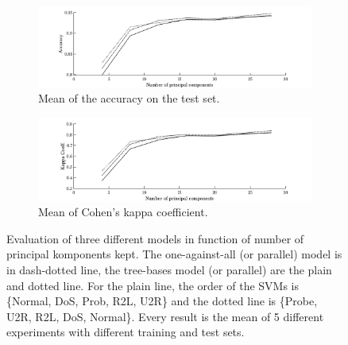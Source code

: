 \begin{figure}[ht!]
        \begin{subfigure}[b]{1\textwidth}  
            \centering 
            \includegraphics[width=.98\textwidth]{parts/chap-4/img-svm/pca-acc.png}
            \caption{Mean of the accuracy on the test set.} 
        \end{subfigure}
        \vfill
        \begin{subfigure}[b]{1\textwidth}   
            \centering 
            \includegraphics[width=.98\textwidth]{parts/chap-4/img-svm/pca-kappa.png}
            \caption{Mean of Cohen's kappa coefficient.} 
        \end{subfigure}
        \caption{Evaluation of three different models in function of number of principal komponents kept. The one-against-all (or parallel) model is in dash-dotted line, the tree-bases model (or parallel) are the plain and dotted line. For the plain line, the order of the SVMs is \{Normal, DoS, Prob, R2L, U2R\} and the dotted line is \{Probe, U2R, R2L, DoS, Normal\}. Every result is the mean of 5 different experiments with different training and test sets.}
        \label{fig:svm-pca}
\end{figure}

